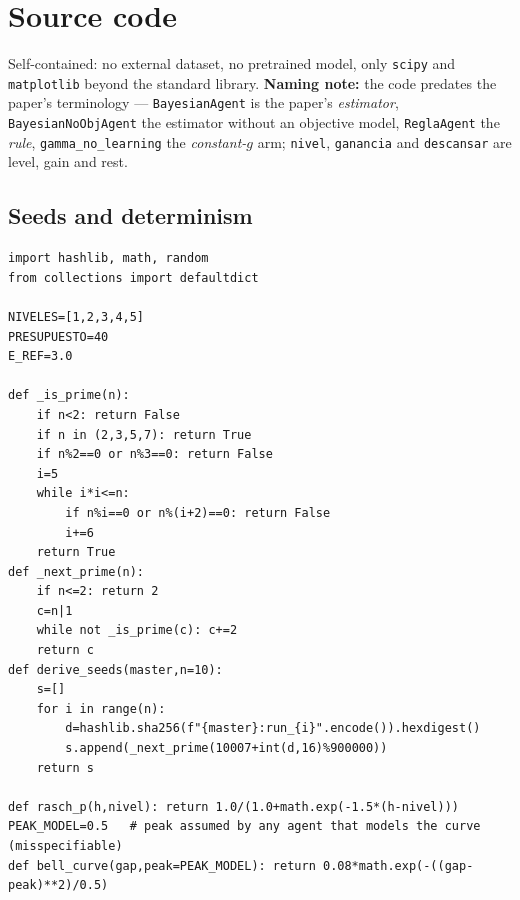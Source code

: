\documentclass{article}
\begin{document}
\section{Source code}
\label{app:code}
Self-contained: no external dataset, no pretrained model, only \texttt{scipy} and \texttt{matplotlib} beyond the standard library. \textbf{Naming note:} the code predates the paper's terminology --- \texttt{BayesianAgent} is the paper's \emph{estimator}, \texttt{BayesianNoObjAgent} the estimator without an objective model, \texttt{ReglaAgent} the \emph{rule}, \texttt{gamma\_no\_learning} the \emph{constant-$g$} arm; \texttt{nivel}, \texttt{ganancia} and \texttt{descansar} are level, gain and rest.
\footnotesize
\subsection{Seeds and determinism}
\begin{verbatim}
import hashlib, math, random
from collections import defaultdict

NIVELES=[1,2,3,4,5]
PRESUPUESTO=40
E_REF=3.0

def _is_prime(n):
    if n<2: return False
    if n in (2,3,5,7): return True
    if n%2==0 or n%3==0: return False
    i=5
    while i*i<=n:
        if n%i==0 or n%(i+2)==0: return False
        i+=6
    return True
def _next_prime(n):
    if n<=2: return 2
    c=n|1
    while not _is_prime(c): c+=2
    return c
def derive_seeds(master,n=10):
    s=[]
    for i in range(n):
        d=hashlib.sha256(f"{master}:run_{i}".encode()).hexdigest()
        s.append(_next_prime(10007+int(d,16)%900000))
    return s

def rasch_p(h,nivel): return 1.0/(1.0+math.exp(-1.5*(h-nivel)))
PEAK_MODEL=0.5   # peak assumed by any agent that models the curve (misspecifiable)
def bell_curve(gap,peak=PEAK_MODEL): return 0.08*math.exp(-((gap-peak)**2)/0.5)
\end{verbatim}
\end{document}
